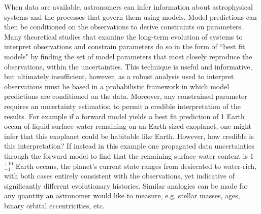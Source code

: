 When data are available, astronomers can infer information about astrophysical systems and the processes that govern them using models. Model predictions can then be conditioned on the observations to derive constraints on parameters. Many theoretical studies that examine the long-term evolution of systems to interpret observations and constrain parameters do so in the form of ``best fit models" by finding the set of model parameters that most closely reproduce the observations, within the uncertainties.  This technique is useful and informative, but ultimately insufficient, however, as a robust analysis used to interpret observations must be based in a probabilistic framework in which model predictions are conditioned on the data. Moreover, any constrained parameter requires an uncertainty estimation to permit a credible interpretation of the results.  For example if a forward model yields a best fit prediction of 1 Earth ocean of liquid surface water remaining on an Earth-sized exoplanet, one might infer that this exoplanet could be habitable like Earth. However, how credible is this interpretation?  If instead in this example one propagated data uncertainties through the forward model to find that the remaining surface water content is 1$^{+10}_{-1}$ Earth oceans, the planet's current state ranges from desiccated to water-rich, with both cases entirely consistent with the observations, yet indicative of significantly different evolutionary histories. Similar analogies can be made for any quantity an astronomer would like to measure, e.g. stellar masses, ages, binary orbital eccentricities, etc.

